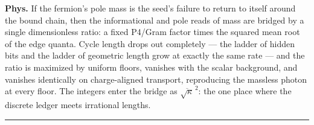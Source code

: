 \begin{theorem}
\textbf{Phys.} If the fermion's pole mass is the seed's failure to return to itself around the bound chain, then the informational and pole reads of mass are bridged by a single dimensionless ratio: a fixed P4/Gram factor times the squared mean root of the edge quanta. Cycle length drops out completely — the ladder of hidden bits and the ladder of geometric length grow at exactly the same rate — and the ratio is maximized by uniform floors, vanishes with the scalar background, and vanishes identically on charge-aligned transport, reproducing the massless photon at every floor. The integers enter the bridge as $\overline{\sqrt\kappa}^{\,2}$: the one place where the discrete ledger meets irrational lengths.

\vspace{2pt}\noindent\rule{\textwidth}{0.4pt}\vspace{2pt}

\end{theorem}


